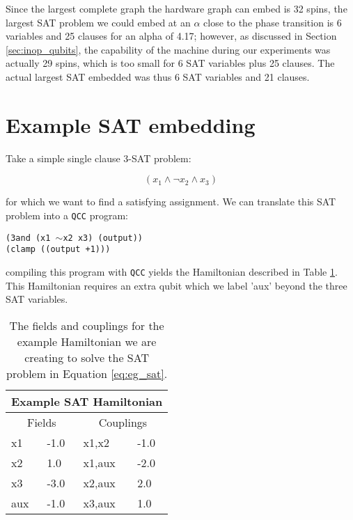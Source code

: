 Since the largest complete graph the hardware graph can embed is 32 spins, the largest SAT problem we could embed at an $\alpha$ close to the phase transition is 6 variables and 25 clauses for an alpha of 4.17; however, as discussed in Section \ref{sec:inop_qubits}, the capability of the \machine machine during our experiments was actually 29 spins, which is too small for 6 SAT variables plus 25 clauses.  The actual largest SAT embedded was thus 6 SAT variables and 21 clauses.

\section{Example SAT embedding}
Take a simple single clause 3-SAT problem:

\begin{equation}
	(x_1 \wedge \neg x_2 \wedge x_3)
	\label{eq:eg_sat}
\end{equation}

for which we want to find a satisfying assignment.  We can translate this SAT problem into a \texttt{QCC} program:

\begin{center}
	\texttt{(3and (x1 $\sim$x2 x3) (output))}\\
	\texttt{(clamp ((output +1)))}
\end{center}

compiling this program with \texttt{QCC} yields the Hamiltonian described in Table \ref{tab:eg_sat}.  This Hamiltonian requires an extra qubit which we label 'aux' beyond the three SAT variables.

\begin{table}
	\begin{center}
\begin{tabular}{ | l | l | l | l |}
	\hline
	\multicolumn{4}{|c|}{Example SAT Hamiltonian} \\ \hline
	\multicolumn{2}{|c|}{Fields} & \multicolumn{2}{c|}{Couplings} \\ \hline
	x1 & -1.0 & x1,x2 & -1.0 \\
	x2 & 1.0 & x1,aux & -2.0 \\
	x3 & -3.0 & x2,aux & 2.0 \\
	aux & -1.0 & x3,aux & 1.0 \\ \hline
\end{tabular}
\end{center}
\caption[Example SAT Hamiltonian]{The fields and couplings for the example Hamiltonian we are creating to solve the SAT problem in Equation \ref{eq:eg_sat}.}
\label{tab:eg_sat}
\end{table}

